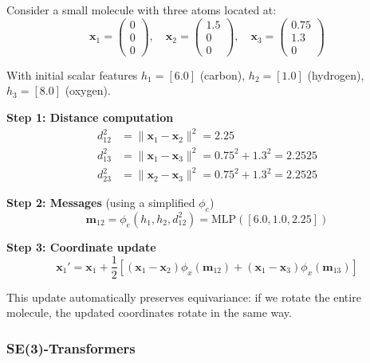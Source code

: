 \begin{example}\label{ex:egnn_molecular}
Consider a small molecule with three atoms located at:
\begin{equation}
\mathbf{x}_1 = \begin{pmatrix} 0 \\ 0 \\ 0 \end{pmatrix}, \quad
\mathbf{x}_2 = \begin{pmatrix} 1.5 \\ 0 \\ 0 \end{pmatrix}, \quad
\mathbf{x}_3 = \begin{pmatrix} 0.75 \\ 1.3 \\ 0 \end{pmatrix}
\end{equation}

With initial scalar features $h_1 = [6.0]$ (carbon), $h_2 = [1.0]$ (hydrogen), $h_3 = [8.0]$ (oxygen).

\textbf{Step 1: Distance computation}
\begin{align}
d_{12}^2 &= \|\mathbf{x}_1 - \mathbf{x}_2\|^2 = 2.25 \\
d_{13}^2 &= \|\mathbf{x}_1 - \mathbf{x}_3\|^2 = 0.75^2 + 1.3^2 = 2.2525 \\
d_{23}^2 &= \|\mathbf{x}_2 - \mathbf{x}_3\|^2 = 0.75^2 + 1.3^2 = 2.2525
\end{align}

\textbf{Step 2: Messages} (using a simplified $\phi_e$)
\begin{equation}
\mathbf{m}_{12} = \phi_e(h_1, h_2, d_{12}^2) = \text{MLP}([6.0, 1.0, 2.25])
\end{equation}

\textbf{Step 3: Coordinate update}
\begin{equation}
\mathbf{x}_1' = \mathbf{x}_1 + \frac{1}{2}\left[(\mathbf{x}_1 - \mathbf{x}_2)\phi_x(\mathbf{m}_{12}) + (\mathbf{x}_1 - \mathbf{x}_3)\phi_x(\mathbf{m}_{13})\right]
\end{equation}

This update automatically preserves equivariance: if we rotate the entire molecule, the updated coordinates rotate in the same way.
\end{example}

\subsubsection{SE(3)-Transformers}

